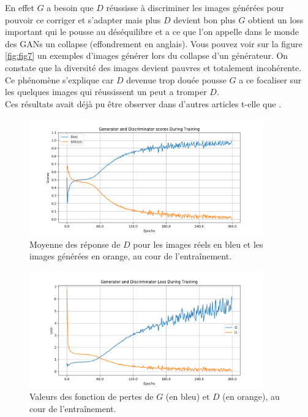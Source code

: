 \documentclass[11pt,francais]{article}
\begin{document}
En effet \(G\) a besoin que \(D\) réussisse à discriminer les images générées pour pouvoir ce corriger et s'adapter mais plus \(D\) devient bon plus \(G\) obtient un loss important qui le pousse au déséquilibre et a ce que l'on appelle dans le monde des GANs un collapse (effondrement en anglais). Vous pouvez voir sur la figure \ref{fig:fig7} un exemples d'images générer lors du collapse d'un générateur. On constate que la diversité des images devient pauvres et totalement incohérente. Ce phénomène s'explique car \(D\) devenue trop douée pousse \(G\) a ce focaliser sur les quelques images qui réussissent un peut a tromper \(D\).\\ 
Ces résultats avait déjà pu être observer dans d'autres articles t-elle que \cite{NIPS2014_5423}.

\begin{figure}[!h]
    \centering
    \includegraphics[width=0.9\textwidth]{Figures/LossG_et_Convergeance/scores300-64.png}
    \caption{Moyenne des réponse de \(D\) pour les images réels en bleu et les images générées en orange, au cour de l'entraînement.}
    \label{fig:fig5}
\end{figure}

\begin{figure}[!h]
    \centering
    \includegraphics[width=0.9\textwidth]{Figures/LossG_et_Convergeance/losses300-64.png}
    \caption{Valeurs des fonction de pertes de \(G\) (en bleu) et \(D\) (en orange), au cour de l'entraînement.}
    \label{fig:fig6}
\end{figure}
\end{document}
